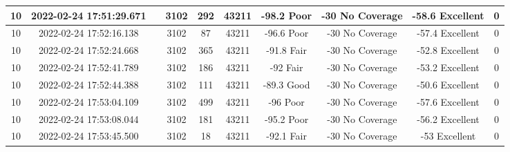 \begin{longtable*}{|c|c|c|c|c|c|c|c|c|c|}
10&2022-02-24 17:51:29.671&&3102&292&43211& -98.2     Poor        & -30       No Coverage & -58.6     Excellent   & 0\\\hline
{}10&2022-02-24 17:52:16.138&&3102&87&43211& -96.6     Poor        & -30       No Coverage & -57.4     Excellent   & 0\\\hline
{}10&2022-02-24 17:52:24.668&&3102&365&43211& -91.8     Fair        & -30       No Coverage & -52.8     Excellent   & 0\\\hline
{}10&2022-02-24 17:52:41.789&&3102&186&43211& -92       Fair        & -30       No Coverage & -53.2     Excellent   & 0\\\hline
{}10&2022-02-24 17:52:44.388&&3102&111&43211& -89.3     Good        & -30       No Coverage & -50.6     Excellent   & 0\\\hline
{}10&2022-02-24 17:53:04.109&&3102&499&43211& -96       Poor        & -30       No Coverage & -57.6     Excellent   & 0\\\hline
{}10&2022-02-24 17:53:08.044&&3102&181&43211& -95.2     Poor        & -30       No Coverage & -56.2     Excellent   & 0\\\hline
{}10&2022-02-24 17:53:45.500&&3102&18&43211& -92.1     Fair        & -30       No Coverage & -53       Excellent   & 0\\\hline

\end{longtable*}
